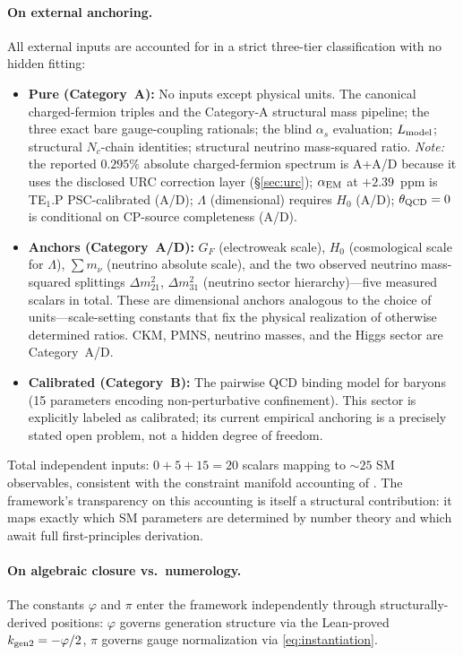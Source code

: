 \documentclass[11pt]{article}
\theoremstyle{remark}
\begin{document}
\paragraph{On external anchoring.}
All external inputs are accounted for in a strict three-tier classification with no hidden fitting:
\begin{itemize}[leftmargin=1.2em,itemsep=0.1em]
  \item \textbf{Pure (Category~A):} No inputs except physical units.
    The canonical charged-fermion triples and the Category-A structural mass pipeline; the three exact bare gauge-coupling rationals; the blind $\alpha_s$ evaluation; $L_{\rm model}$; structural $N_c$-chain identities; structural neutrino mass-squared ratio.
    \emph{Note:} the reported $0.295\%$ absolute charged-fermion spectrum is A+A/D because it uses the disclosed URC correction layer (\S\ref{sec:urc}); $\alpha_{\rm EM}$ at $+2.39$~ppm is TE$_1$.P PSC-calibrated (A/D); $\Lambda$ (dimensional) requires $H_0$ (A/D); $\theta_{\rm QCD}=0$ is conditional on CP-source completeness (A/D).
  \item \textbf{Anchors (Category~A/D):} $G_F$ (electroweak scale), $H_0$ (cosmological scale for $\Lambda$), $\sum m_\nu$ (neutrino absolute scale), and the two observed neutrino mass-squared splittings $\Delta m^2_{21}$, $\Delta m^2_{31}$ (neutrino sector hierarchy)---five measured scalars in total.
    These are dimensional anchors analogous to the choice of units---scale-setting constants that fix the physical realization of otherwise determined ratios.
    CKM, PMNS, neutrino masses, and the Higgs sector are Category~A/D.
  \item \textbf{Calibrated (Category~B):} The pairwise QCD binding model for baryons (15 parameters encoding non-perturbative confinement).
    This sector is explicitly labeled as calibrated; its current empirical anchoring is a precisely stated open problem, not a hidden degree of freedom.
\end{itemize}
Total independent inputs: $0 + 5 + 15 = 20$ scalars mapping to $\sim\!25$ SM observables, consistent with the constraint manifold accounting of .
The framework's transparency on this accounting is itself a structural contribution: it maps exactly which SM parameters are determined by number theory and which await full first-principles derivation.

\paragraph{On algebraic closure vs.~numerology.}
The constants $\varphi$ and $\pi$ enter the framework independently through structurally-derived positions: $\varphi$ governs generation structure via the Lean-proved $k_{\rm gen2} = -\varphi/2$, $\pi$ governs gauge normalization via \cref{eq:instantiation}.
\end{document}
